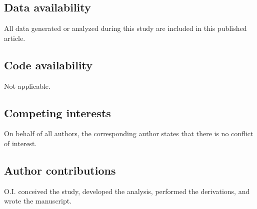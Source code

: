 \documentclass[pdflatex,sn-mathphys-num]{sn-jnl}
\theoremstyle{thmstylethree}
\theoremstyle{thmstyleone}
\theoremstyle{thmstyletwo}
\numberwithin{equation}{section}
\begin{document}
    \subsection*{Data availability}
        All data generated or analyzed during this study are included in this published article.
    
    \subsection*{Code availability}
        Not applicable.
    
    \subsection*{Competing interests}
        On behalf of all authors, the corresponding author states that there is no conflict of interest.
        
    \subsection*{Author contributions}
        O.I. conceived the study, developed the analysis, performed the derivations, and wrote the manuscript.
\end{document}
